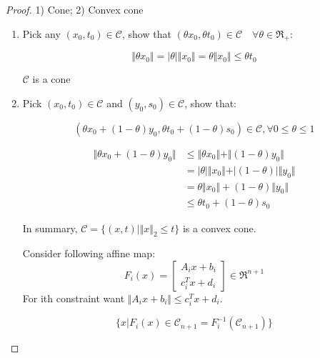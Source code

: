 \begin{proof}
	1) Cone; 2) Convex cone
	
	\begin{enumerate}
		\item Pick any $(x_0, t_0)\in \mathcal{C}$, show that $(\theta x_0, \theta t_0)\in \mathcal{C} \quad\forall \theta \in \Re_+$:
		
		\begin{equation*}
		\Vert \theta x_0\Vert = \vert \theta \vert \Vert x_0\Vert = \theta \Vert x_0\Vert \leq \theta t_0
		\end{equation*}
		
		$\mathcal{C}$ is a cone
		
		\item Pick $(x_0, t_0)\in \mathcal{C}$ and $(y_0, s_0)\in \mathcal{C}$, show that:
		
		\begin{equation*}
		(\theta x_0 + (1-\theta)y_0, \theta t_0 + (1-\theta)s_0)\in \mathcal{C}, \forall 0\leq \theta \leq 1
		\end{equation*}
		
		\begin{align*}
		\Vert \theta x_0 + (1-\theta)y_0\Vert &\leq \Vert \theta x_0\Vert + \Vert (1-\theta)y_0\Vert\\
		&= \vert \theta \vert \Vert x_0\Vert + \vert (1-\theta) \vert \Vert y_0\Vert\\
		&= \theta \Vert x_0\Vert +  (1-\theta)\Vert y_0\Vert\\
		&\leq \theta t_0 + (1-\theta)s_0
		\end{align*}
		
		In summary, $\mathcal{C} = \{(x,t)\vert \Vert x\Vert_2 \leq t \}$ is a convex cone.
		
		Consider following affine map:
		\begin{equation*}
		F_i(x) = \begin{bmatrix}
		A_ix+b_i\\
		c_i^Tx+d_i
		\end{bmatrix}\in \Re^{n+ 1}
		\end{equation*}
		For ith constraint want $\Vert A_ix+b_i\Vert \leq c^T_ix+d_i$.
		
		\begin{equation*}
		\{x\vert F_i(x)\in \mathcal{C}_{n+ 1} = F_i^{-1}(\mathcal{C}_{n+ 1}) \}
		\end{equation*}
	\end{enumerate}
\end{proof}

